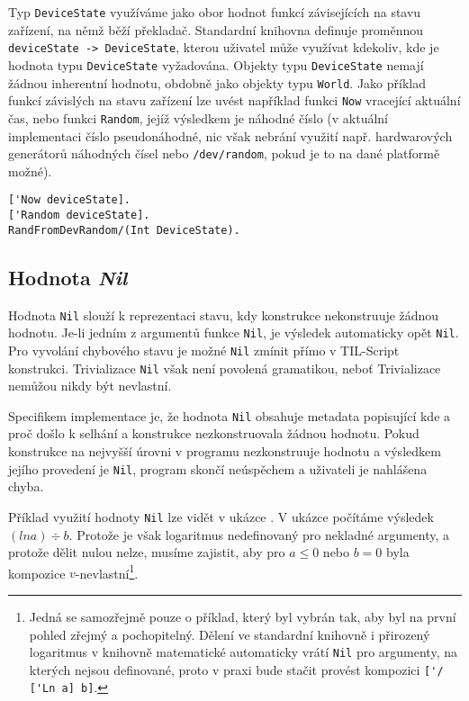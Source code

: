 Typ \lstinline{DeviceState} využíváme jako obor hodnot funkcí závisejících na stavu zařízení,
na němž běží překladač. Standardní knihovna definuje proměnnou
\lstinline{deviceState -> DeviceState}, kterou uživatel může využívat kdekoliv, kde je hodnota typu
\lstinline{DeviceState} vyžadována. Objekty typu \lstinline{DeviceState} nemají žádnou inherentní
hodnotu, obdobně jako objekty typu \lstinline{World}. Jako příklad funkcí závislých na stavu
zařízení lze uvést například funkci \lstinline{Now} vracející aktuální čas, nebo funkci
\lstinline{Random}, jejíž výsledkem je náhodné číslo (v aktuální implementaci číslo pseudonáhodné,
nic však nebrání využití např. hardwarových generátorů náhodných čísel nebo
\lstinline{/dev/random}, pokud je to na dané platformě možné).

\begin{lstlisting}[caption={Příklad funkcí závislých na stavu zařízení}]
['Now deviceState].
['Random deviceState].
RandFromDevRandom/(Int DeviceState).
\end{lstlisting}

\subsection{Hodnota \textit{Nil}}\label{nil-value}

Hodnota \lstinline{Nil} slouží k reprezentaci stavu, kdy konstrukce nekonstruuje žádnou hodnotu.
Je-li jedním z argumentů funkce \lstinline{Nil}, je výsledek automaticky opět \lstinline{Nil}.
Pro vyvolání chybového stavu je možné \lstinline{Nil} zmínit přímo v TIL-Script konstrukci.
Trivializace \lstinline{Nil} však není povolená gramatikou, neboť Trivializace nemůžou nikdy
být nevlastní.

Specifikem implementace je, že hodnota \lstinline{Nil} obsahuje metadata popisující kde a proč
došlo k selhání a konstrukce nezkonstruovala žádnou hodnotu. Pokud konstrukce na nejvyšší úrovni
v programu nezkonstruuje hodnotu a výsledkem jejího provedení je \lstinline{Nil}, program skončí
neúspěchem a uživateli je nahlášena chyba.

Příklad využití hodnoty \lstinline{Nil} lze vidět v ukázce . V ukázce počítáme
výsledek $(ln a) \div b$. Protože je však logaritmus nedefinovaný pro nekladné argumenty, a protože
dělit nulou nelze, musíme zajistit, aby pro $a \le 0$ nebo $b = 0$ byla kompozice
$v$-nevlastní\footnote{
  Jedná se samozřejmě pouze o příklad, který byl vybrán tak, aby byl na první pohled zřejmý
  a pochopitelný. Dělení ve standardní knihovně i přirozený logaritmus v knihovně matematické
  automaticky vrátí \lstinline{Nil} pro argumenty, na kterých nejsou definované, proto v praxi bude
  stačit provést kompozici \lstinline{['/ ['Ln a] b]}.
}.

